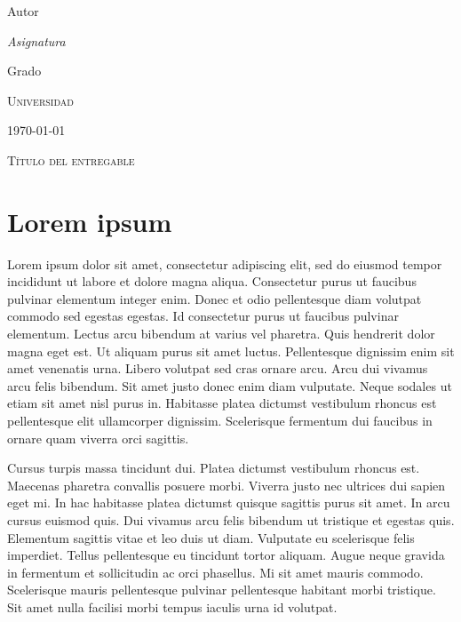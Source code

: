 \documentclass[
  a4paper,
  spanish,
  12pt,
]{scrartcl}
\theoremstyle{ejercicio-style}
\theoremstyle{remark-style}
\begin{document}
\begin{flushright}
  Autor\vspace{.5em}

  \textit{Asignatura}

  Grado

  \textsc{Universidad}\vspace{.5em}

  \today\vspace{.5em}
\end{flushright}

\begin{flushleft}
  \scshape\Large Título del entregable
\end{flushleft}

\section{Lorem ipsum}

Lorem ipsum dolor sit amet, consectetur adipiscing elit, sed do eiusmod tempor incididunt ut labore et dolore magna aliqua. Consectetur purus ut faucibus pulvinar elementum integer enim. Donec et odio pellentesque diam volutpat commodo sed egestas egestas. Id consectetur purus ut faucibus pulvinar elementum. Lectus arcu bibendum at varius vel pharetra. Quis hendrerit dolor magna eget est. Ut aliquam purus sit amet luctus. Pellentesque dignissim enim sit amet venenatis urna. Libero volutpat sed cras ornare arcu. Arcu dui vivamus arcu felis bibendum. Sit amet justo donec enim diam vulputate. Neque sodales ut etiam sit amet nisl purus in. Habitasse platea dictumst vestibulum rhoncus est pellentesque elit ullamcorper dignissim. Scelerisque fermentum dui faucibus in ornare quam viverra orci sagittis.

Cursus turpis massa tincidunt dui. Platea dictumst vestibulum rhoncus est. Maecenas pharetra convallis posuere morbi. Viverra justo nec ultrices dui sapien eget mi. In hac habitasse platea dictumst quisque sagittis purus sit amet. In arcu cursus euismod quis. Dui vivamus arcu felis bibendum ut tristique et egestas quis. Elementum sagittis vitae et leo duis ut diam. Vulputate eu scelerisque felis imperdiet. Tellus pellentesque eu tincidunt tortor aliquam. Augue neque gravida in fermentum et sollicitudin ac orci phasellus. Mi sit amet mauris commodo. Scelerisque mauris pellentesque pulvinar pellentesque habitant morbi tristique. Sit amet nulla facilisi morbi tempus iaculis urna id volutpat.
\end{document}
